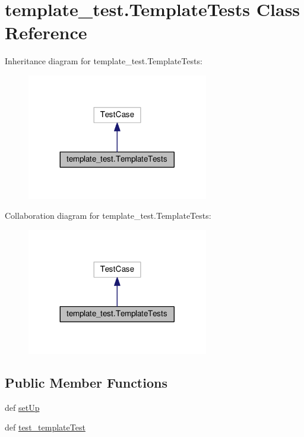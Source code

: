 \hypertarget{classtemplate__test_1_1TemplateTests}{\section{template\-\_\-test.\-Template\-Tests Class Reference}
\label{classtemplate__test_1_1TemplateTests}
}


Inheritance diagram for template\-\_\-test.\-Template\-Tests\-:
\nopagebreak
\begin{figure}[H]
\begin{center}
\leavevmode
\includegraphics[width=224pt]{classtemplate__test_1_1TemplateTests__inherit__graph}
\end{center}
\end{figure}


Collaboration diagram for template\-\_\-test.\-Template\-Tests\-:
\nopagebreak
\begin{figure}[H]
\begin{center}
\leavevmode
\includegraphics[width=224pt]{classtemplate__test_1_1TemplateTests__coll__graph}
\end{center}
\end{figure}
\subsection*{Public Member Functions}
\begin{DoxyCompactItemize}
\item 
def \hyperlink{classtemplate__test_1_1TemplateTests_aae2dc70a93e3d138b6c2927baecaf434}{set\-Up}
\item 
def \hyperlink{classtemplate__test_1_1TemplateTests_a14c347bff3d6b95f3e04660fb0542749}{test\-\_\-template\-Test}
\end{DoxyCompactItemize}
